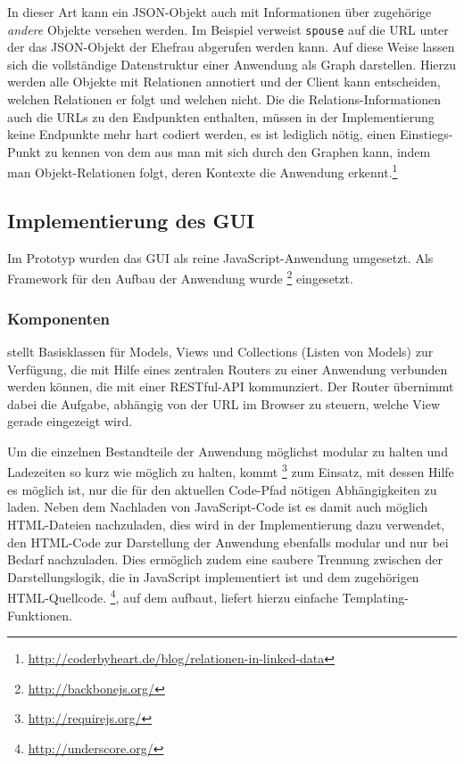 In dieser Art kann ein JSON-Objekt auch mit Informationen über zugehörige \emph{andere} Objekte versehen werden. Im Beispiel verweist \texttt{spouse} auf die URL unter der das JSON-Objekt der Ehefrau abgerufen werden kann. Auf diese Weise lassen sich die vollständige Datenstruktur einer Anwendung als Graph darstellen. Hierzu werden alle Objekte mit Relationen annotiert und der Client kann entscheiden, welchen Relationen er folgt und welchen nicht. Die die Relations-Informationen auch die URLs zu den Endpunkten enthalten, müssen in der Implementierung keine Endpunkte mehr hart codiert werden, es ist lediglich nötig, einen Einstiegs-Punkt zu kennen von dem aus man mit sich durch den Graphen  kann, indem man Objekt-Relationen folgt, deren Kontexte die Anwendung erkennt.\footnote{\url{http://coderbyheart.de/blog/relationen-in-linked-data}}

\pagebreak

\subsection{Implementierung des GUI}\label{l:implementierung-gui}

Im Prototyp wurden das GUI als reine JavaScript-Anwendung umgesetzt. Als Framework für den Aufbau der Anwendung wurde \footnote{\url{http://backbonejs.org/}} eingesetzt. 

\subsubsection{Komponenten}

 stellt Basisklassen für Models, Views und Collections (Listen von Models) zur Verfügung, die mit Hilfe eines zentralen Routers zu einer Anwendung verbunden werden können, die mit einer RESTful-API kommunziert. Der Router übernimmt dabei die Aufgabe, abhängig von der URL im Browser zu steuern, welche View gerade eingezeigt wird. 

Um die einzelnen Bestandteile der Anwendung möglichst modular zu halten und Ladezeiten so kurz wie möglich zu halten, kommt \footnote{\url{http://requirejs.org/}} zum Einsatz, mit dessen Hilfe es möglich ist, nur die für den aktuellen Code-Pfad nötigen Abhängigkeiten zu laden. Neben dem Nachladen von Ja\-va\-Scr\-ipt-Code ist es damit auch möglich HTML-Dateien nachzuladen, dies wird in der Implementierung dazu verwendet, den HTML-Code zur Darstellung der Anwendung ebenfalls modular und nur bei Bedarf nachzuladen. Dies ermöglich zudem eine saubere Trennung zwischen der Darstellungslogik, die in JavaScript implementiert ist und dem zugehörigen HTML-Quellcode. \footnote{\url{http://underscore.org/}}, auf dem  aufbaut, liefert hierzu einfache Templating-Funktionen.

